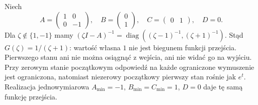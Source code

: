 \begin{przyklad}
\label{prz:lin28-hidden-mode}
Niech
\[
 A=\begin{pmatrix}1&0\\0&-1\end{pmatrix},
 \quad B=\begin{pmatrix}0\\1\end{pmatrix},
 \quad C=\begin{pmatrix}0&1\end{pmatrix},\quad D=0.
\]
Dla \(\zeta\notin\{1,-1\}\)
mamy \((\zeta I-A)^{-1}
=\operatorname{diag}((\zeta-1)^{-1},(\zeta+1)^{-1})\).
Stąd \(G(\zeta)=1/(\zeta+1)\):
wartość własna \(1\) nie jest biegunem
funkcji przejścia. Pierwszego stanu
ani nie można osiągnąć z wejścia,
ani nie widać go na wyjściu.
Przy zerowym stanie początkowym odpowiedź
na każde ograniczone wymuszenie jest ograniczona,
natomiast niezerowy początkowy pierwszy stan
rośnie jak \(e^t\).
Realizacja jednowymiarowa
\(A_{\min}=-1\), \(B_{\min}=C_{\min}=1\), \(D=0\)
daje tę samą funkcję przejścia.
\end{przyklad}

